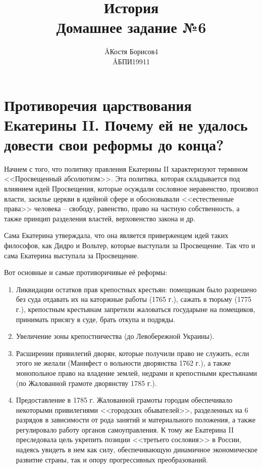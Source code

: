 \documentclass[12pt]{article}
\title{История \\ Домашнее задание №6}
\author{\AA{Костя Борисов}{4} \\ \AA{БПИ199}{11}}
\begin{document}
  \maketitle

  \section{Противоречия царствования Екатерины II. Почему ей не удалось довести свои реформы до конца?}
  Начнем с того, что политику правления Екатерины II характеризуют термином <<Просвещенный абсолютизм>>.
  Эта политика, которая складывается под влиянием идей Просвещения,
  которые осуждали сословное неравенство, произвол власти,
  засилье церкви в идейной сфере и обосновывали <<естественные права>> человека -- свободу,
  равенство, право на частную собственность, а также принцип разделения властей, верховенство закона и др.

  Сама Екатерина утверждала, что она является приверженцем идей таких философов, как Дидро и Вольтер, которые выступали за Просвещение.
  Так что и сама Екатерина выступала за Просвещение.

  Вот основные и самые противоричивые её реформы:
  \begin{enumerate}
    \item
    Ликвидации остатков прав крепостных крестьян:
    помещикам было разрешено без суда отдавать их на каторжные работы (1765 г.), сажать в тюрьму (1775 г.),
    крепостным крестьянам запретили жаловаться государыне на помещиков, принимать присягу в суде, брать откупа и подряды.

    \item
    Увеличение зоны крепостничества (до Левобережной Украины).

    \item
    Расширении привилегий дворян, которые получили право не служить, если этого не желали (Манифест о вольности дворянства 1762 г.),
    а также монопольное право на владение землей, недрами и крепостными крестьянами (по Жалованной грамоте дворянству 1785 г.).

    \item
    Предоставление в 1785 г. Жалованной грамоты городам обеспечивало некоторыми привилегиями <<городских обывателей>>,
    разделенных на 6 разрядов в зависимости от рода занятий и материального положения, а также регулировало работу органов самоуправления.
    К тому же Екатерина II преследовала цель укрепить позиции <<третьего сословия>> в России,
    надеясь увидеть в нем как силу, обеспечивающую динамичное экономическое развитие страны, так и опору прогрессивных преобразований.
  \end{enumerate}
\end{document}
